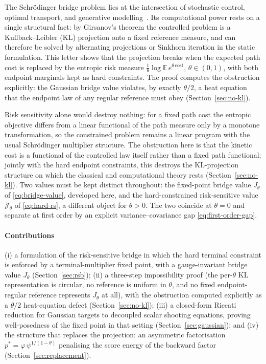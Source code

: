 \documentclass[letterpaper,10pt,conference]{IEEEtran}
\newcommand{\EE}{\mathbb{E}}
\newcommand{\cJ}{\mathcal{J}}
\begin{document}
	The Schr\"odinger bridge problem lies at the intersection of stochastic
	control, optimal transport, and generative
	modelling~\cite{Leonard2014,chen2021liaisons}. Its
	computational power rests on a single structural fact: by Girsanov's theorem
	the controlled problem is a Kullback--Leibler (KL) projection onto a fixed
	reference measure, and can therefore be solved by alternating projections or
	Sinkhorn iteration in the static formulation. This letter shows that the projection
	breaks when the expected path cost is replaced by the entropic risk measure
	$\frac1\theta\log\EE\,e^{\theta\,\mathrm{cost}}$, $\theta\in(0,1)$, with
	both endpoint marginals kept as hard constraints. The proof computes the
	obstruction explicitly: the Gaussian bridge value violates, by exactly
	$\theta/2$, a heat equation that the endpoint law of any regular reference
	must obey (Section~\ref{sec:no-kl}).
	
	Risk sensitivity alone would destroy nothing: for a fixed path cost
	the entropic objective differs from a linear functional of the path measure
	only by a monotone transformation, so the constrained problem remains a linear
	program with the usual Schr\"odinger multiplier structure. The obstruction
	here is that the kinetic cost is a functional of the controlled law itself rather than a fixed path functional; jointly with the hard endpoint constraints, this destroys the KL-projection structure on which the classical
	and computational theory rests (Section~\ref{sec:no-kl}). Two values must be
	kept distinct throughout: the {fixed-point bridge value} $J_\theta$ of
	\eqref{eq:bridge-value}, developed here, and the {hard-constrained
		risk-sensitive value} $\cJ_\theta$ of \eqref{eq:hard-rs}, a different object
	for $\theta>0$. The two coincide at $\theta=0$ and separate at first order by
	an explicit variance--covariance gap \eqref{eq:first-order-gap}.
	
	\paragraph*{Contributions}
	(i) a formulation of the risk-sensitive bridge in which the hard terminal
	constraint is enforced by a terminal-multiplier fixed point, with a
	gauge-invariant bridge value $J_\theta$ (Section~\ref{sec:rsb});
	(ii) a three-step impossibility proof (the per-$\theta$ KL representation is circular, no reference is uniform in $\theta$, and no fixed endpoint-regular reference represents $J_\theta$ at all), with the obstruction computed
	explicitly as a $\theta/2$ heat-equation defect (Section~\ref{sec:no-kl});
	(iii) a closed-form Riccati reduction for Gaussian targets to decoupled scalar
	shooting equations, proving well-posedness of the fixed point in that setting
	(Section~\ref{sec:gaussian}); and
	(iv) the structure that replaces the projection: an asymmetric factorisation
	$p^*=\varphi\,\psi^{1/(1-\theta)}$ penalising the score energy of the backward
	factor (Section~\ref{sec:replacement}).
	
\end{document}
